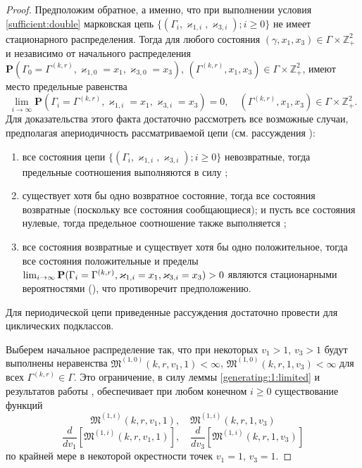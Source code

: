 \documentclass[a4paper,twoside]{article}
\theoremstyle{theorem}
\theoremstyle{remark}
\renewcommand*{\hm}[1]{#1\nobreak\discretionary{}%
	{\hbox{$\mathsurround=0pt #1$}}{}}%
\renewcommand{\Pr}{{\mathbf P}}
\begin{document}
\begin{proof}
Предположим обратное, а именно, что при выполнении условия \eqref{sufficient:double} марковская цепь $\{(\Gamma_i, \varkappa_{1,i},\varkappa_{3,i}); i \geqslant 0\}$ не имеет стационарного распределения. 
Тогда для любого состояния $(\gamma,x_1,x_3)\in \Gamma \times {\mathbb Z}^2_+$ и независимо от начального распределения $\Pr(\Gamma_{0}=\Gamma^{(k,r)}, \varkappa_{1,0}=x_1, \varkappa_{3,0}=x_3)$,
$(\Gamma^{(k,r)},x_1,x_3)\in \Gamma \times {\mathbb Z}^2_+$, 
имеют место предельные равенства 
\begin{equation}
\lim_{i \to \infty} \Pr(\Gamma_{i}=\Gamma^{(k,r)}, \varkappa_{1,i}=x_1, \varkappa_{3,i}=x_3) =0, \quad  (\Gamma^{(k,r)},x_1,x_3)\in \Gamma \times {\mathbb Z}^2_+.
\label{zero:limit:equations:1}
\end{equation} 
Для доказательства этого факта достаточно рассмотреть все возможные случаи, предполагая апериодичность рассматриваемой цепи (см. рассуждения \cite[гл. $3$, \linebreak \S~3-4]{Shiryaev}):
\begin{enumerate}
\item все состояния цепи $\{(\Gamma_i, \varkappa_{1,i},\varkappa_{3,i}); i \geqslant 0\}$ невозвратные, тогда предельные соотношения выполняются в силу \cite[с. 541, лемма $2$]{Shiryaev};
\item существует хотя бы одно возвратное состояние, тогда все состояния возвратные (поскольку все состояния сообщающиеся); и пусть все состояния нулевые, тогда предельное соотношение также выполняется \cite[с. 541, лемма $3$]{Shiryaev};
\item все состояния возвратные и существует хотя бы одно положительное, тогда все состояния положительные и пределы $\lim_{i \to \infty} \Pr(\Gamma_{i}\hm= \Gamma^{(k,r)}, \varkappa_{1,i}\hm= x_1, \varkappa_{3,i}\hm= x_3) > 0$ являются стационарными вероятностями ({\cite[с. 549, теорема $1$]{Shiryaev}}), что противоречит предположению.
\end{enumerate}
Для периодической цепи приведенные рассуждения достаточно провести для циклических подклассов.

Выберем начальное распределение так, что при некоторых $v_1 >1$, $v_3 >1$ будут выполнены неравенства $\mathfrak{M}^{(1,0)}(k,r,v_1,1) <\infty$, $\mathfrak{M}^{(1,0)}(k,r,1,v_3) <\infty$ для всех $\Gamma^{(k,r)}\in \Gamma$. Это ограничение, в силу леммы \eqref{generating:1:limited} и результатов работы \cite{Kocheganov:2017:1}, обеспечивает при любом конечном $i\geqslant 0$ существование функций 
\begin{equation}
\mathfrak{M}^{(1,i)}(k,r,v_1,1), \quad \mathfrak{M}^{(1,i)}(k,r,1,v_3)
\end{equation}
\begin{equation}
\frac{d}{dv_1} \left[\mathfrak{M}^{(1,i)}(k,r,v_1,1)\right], \quad \frac{d}{dv_3} \left[\mathfrak{M}^{(1,i)}(k,r,1,v_3)\right]
\end{equation}
по крайней мере в некоторой окрестности точек $v_1 = 1$, $v_3=1$.


\end{proof}
\end{document}
